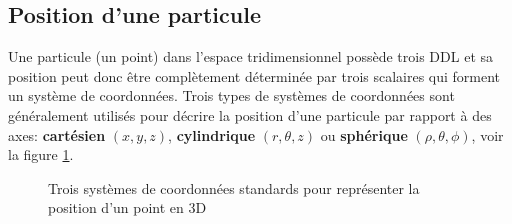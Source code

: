 \subsection{Position d'une particule}
\label{sec:syscoordparticule}

Une particule (un point) dans l'espace tridimensionnel possède trois DDL et sa position peut donc être complètement déterminée par trois scalaires qui forment un système de coordonnées. Trois types de systèmes de coordonnées sont généralement utilisés pour décrire la position d'une particule par rapport à des axes: \textbf{cartésien} $( x, y, z)$, \textbf{cylindrique} $( r, \theta, z)$ ou \textbf{sphérique} $( \rho, \theta, \phi)$, voir la figure \ref{fig:coorsys}.

\begin{figure}[H]
	\centering
	\caption{Trois systèmes de coordonnées standards pour représenter la position d'un point en 3D}
	\label{fig:coorsys}
\end{figure}

